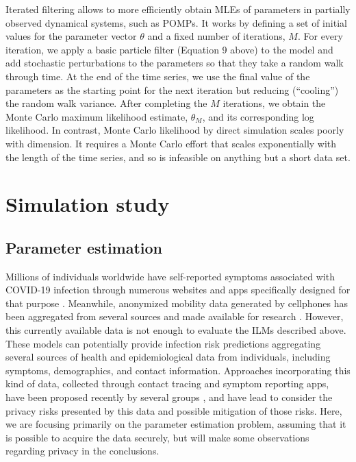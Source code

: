 \documentclass{article}
\begin{document}
Iterated filtering \cite{Ionides2006} allows to more efficiently obtain MLEs of parameters in partially observed dynamical systems, such as POMPs. It works by defining a set of initial values for the parameter vector $\theta$ and a fixed number of iterations, $M$. For every iteration, we apply a basic particle filter (Equation 9 above) to the model and add stochastic perturbations to the parameters so that they take a random walk through time. At the end of the time series, we use the final value of the parameters as the starting point for the next iteration but reducing (“cooling”) the random walk variance. After completing the $M$ iterations, we obtain the Monte Carlo maximum likelihood estimate, $\theta_M$, and its corresponding log likelihood. In contrast, Monte Carlo likelihood by direct simulation scales poorly with dimension. It requires a Monte Carlo effort that scales exponentially with the length of the time series, and so is infeasible on anything but a short data set.

\section{Simulation study}

\subsection{Parameter estimation}

Millions of individuals worldwide have self-reported symptoms associated with COVID-19 infection through numerous websites and apps specifically designed for that purpose \cite{Menni2020}. Meanwhile, anonymized mobility data generated by cellphones has been aggregated from several sources and made available for research \cite{covid19mobility}. However, this currently available data is not enough to evaluate the ILMs described above. These models can potentially provide infection risk predictions aggregating several sources of health and epidemiological data from individuals, including symptoms, demographics, and contact information. Approaches incorporating this kind of data, collected through contact tracing and symptom reporting apps, have been proposed recently by several groups \cite{sphinxteam, Alsdurf2020}, and have lead to consider the privacy risks presented by this data and possible mitigation of those risks. Here, we are focusing primarily on the parameter estimation problem, assuming that it is possible to acquire the data securely, but will make some observations regarding privacy in the conclusions.
\end{document}
